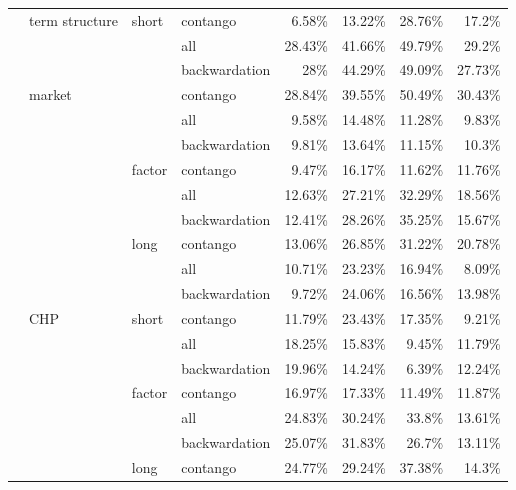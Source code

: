 \documentclass[]{elsarticle} %
\begin{document}
\begin{longtable}[t]{>{}llllrrrr}
\nopagebreak
\multirow[t]{-30}{*}{\raggedright\arraybackslash \textbf{CHP}} & \multirow[t]{-9}{*}{\raggedright\arraybackslash term structure} & \multirow[t]{-3}{*}{\raggedright\arraybackslash short} & contango & 6.58\% & 13.22\% & 28.76\% & 17.2\%\\
\cmidrule{1-8}\pagebreak[0]
 &  &  & all & 28.43\% & 41.66\% & 49.79\% & 29.2\%\\
\nopagebreak
 &  &  & backwardation & 28\% & 44.29\% & 49.09\% & 27.73\%\\
\nopagebreak
 & \multirow[t]{-3}{*}{\raggedright\arraybackslash market} &  & contango & 28.84\% & 39.55\% & 50.49\% & 30.43\%\\
\nopagebreak
 &  &  & all & 9.58\% & 14.48\% & 11.28\% & 9.83\%\\
\nopagebreak
 &  &  & backwardation & 9.81\% & 13.64\% & 11.15\% & 10.3\%\\
\nopagebreak
 &  & \multirow[t]{-6}{*}{\raggedright\arraybackslash factor} & contango & 9.47\% & 16.17\% & 11.62\% & 11.76\%\\
\nopagebreak
 &  &  & all & 12.63\% & 27.21\% & 32.29\% & 18.56\%\\
\nopagebreak
 &  &  & backwardation & 12.41\% & 28.26\% & 35.25\% & 15.67\%\\
\nopagebreak
 &  & \multirow[t]{-3}{*}{\raggedright\arraybackslash long} & contango & 13.06\% & 26.85\% & 31.22\% & 20.78\%\\
\nopagebreak
 &  &  & all & 10.71\% & 23.23\% & 16.94\% & 8.09\%\\
\nopagebreak
 &  &  & backwardation & 9.72\% & 24.06\% & 16.56\% & 13.98\%\\
\nopagebreak
 & \multirow[t]{-9}{*}{\raggedright\arraybackslash CHP} & \multirow[t]{-3}{*}{\raggedright\arraybackslash short} & contango & 11.79\% & 23.43\% & 17.35\% & 9.21\%\\
\nopagebreak
 &  &  & all & 18.25\% & 15.83\% & 9.45\% & 11.79\%\\
\nopagebreak
 &  &  & backwardation & 19.96\% & 14.24\% & 6.39\% & 12.24\%\\
\nopagebreak
 &  & \multirow[t]{-3}{*}{\raggedright\arraybackslash factor} & contango & 16.97\% & 17.33\% & 11.49\% & 11.87\%\\
\nopagebreak
 &  &  & all & 24.83\% & 30.24\% & 33.8\% & 13.61\%\\
\nopagebreak
 &  &  & backwardation & 25.07\% & 31.83\% & 26.7\% & 13.11\%\\
\nopagebreak
 &  & \multirow[t]{-3}{*}{\raggedright\arraybackslash long} & contango & 24.77\% & 29.24\% & 37.38\% & 14.3\%\\

\end{longtable}
\end{document}
